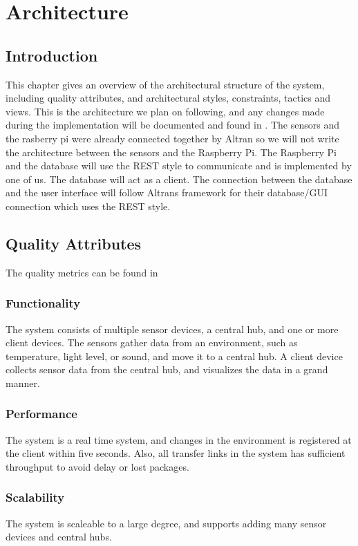 \documentclass[../document.tex]{subfiles}
\begin{document}
\section{Architecture}
\label{architecture}
\subsection{Introduction}
This chapter gives an overview of the architectural structure of the system, including quality attributes, and architectural styles, constraints, tactics and views. This is the architecture we plan on following, and any changes made during the implementation will be documented and found in . The sensors and the rasberry pi were already connected together by \gls{Altran} so we will not write the architecture between the sensors and the Raspberry Pi. The Raspberry Pi and the database will use the \gls{REST} style to communicate and is implemented by one of us. The database will act as a client. The connection between the database and the user interface will follow Altrans framework for their database/GUI connection which uses the \gls{REST} style.

\subsection{Quality Attributes}
\label{quality_attributes}
The quality metrics can be found in 

\subsubsection{Functionality}
The system consists of multiple sensor devices, a central hub, and one or more client devices. The sensors gather data from an environment, such as temperature, light level, or sound, and move it to a central hub. A client device collects sensor data from the central hub, and visualizes the data in a grand manner.

\subsubsection{Performance}
The system is a real time system, and changes in the environment is registered at the client within five seconds. Also, all transfer links in the system has sufficient throughput to avoid delay or lost packages.

\subsubsection{Scalability}
The system is scaleable to a large degree, and supports adding many sensor devices and central hubs.
\end{document}
